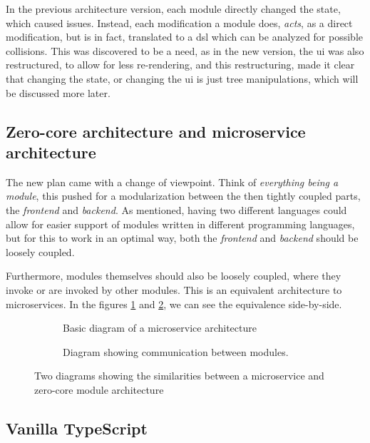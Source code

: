 In the previous architecture version, each module directly changed the state,
which caused issues. Instead, each modification a module does, \textit{acts}, as
a direct modification, but is in fact, translated to a \gls*{dsl} which can be
analyzed for possible collisions. This was discovered to be a need, as in the
new version, the \gls*{ui} was also restructured, to allow for less
re-rendering, and this restructuring, made it clear that changing the state, or
changing the \gls*{ui} is just tree manipulations, which will be discussed more
later.


\subsection{Zero-core architecture and microservice architecture}

The new plan came with a change of viewpoint. Think of
\textit{everything being a module}, this pushed for a modularization between the
then tightly coupled parts, the \textit{frontend} and \textit{backend}. As
mentioned, having two different languages could allow for easier support of
modules written in different programming languages, but for this to work in an
optimal way, both the \textit{frontend} and \textit{backend} should be loosely
coupled.

Furthermore, modules themselves should also be loosely coupled, where they
invoke or are invoked by other modules. This is an equivalent architecture to
microservices. In the figures \ref{sfig:mic} and \ref{sfig:mod}, we can see the
equivalence side-by-side.

\begin{figure}[H]
  \begin{subfigure}[h]{0.49\linewidth}
    
    \caption{Basic diagram of a microservice architecture}
    \label{sfig:mic}
  \end{subfigure}
  \hfill
  \begin{subfigure}[h]{0.49\linewidth}
    
    \caption{
      Diagram showing communication between modules.
    }
    \label{sfig:mod}
  \end{subfigure}
  \caption{
    Two diagrams showing the similarities between a microservice and zero-core
    module architecture
  }
  \label{fig:comp}
\end{figure}


\subsection{Vanilla TypeScript}

